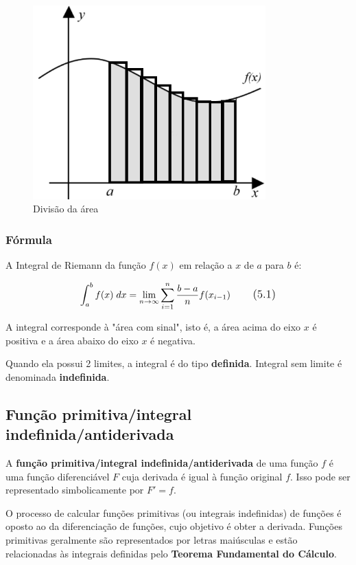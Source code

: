\begin{figure}[H]
	\centering
	\includegraphics[width=0.8\textwidth]{./Imagens/Integral de Riemann/RI2.png} 
	\caption{Divisão da área}
	\label{fig:RI2}
\end{figure}

\subsubsection{Fórmula}

A Integral de Riemann da função $f(x)$ em relação a $x$ de $a$ para $b$ é: 

\begin{equation}
\large \int_{a}^{b}f(x) \; dx = \lim_{n \rightarrow \infty}\sum_{i=1}^{n} \frac{b-a}{n}f(x_{i-1})
\tag{5.1}
\end{equation}

A integral corresponde à "área com sinal", isto é, a área acima do eixo $x$ é positiva e a área abaixo do eixo $x$ é negativa.

Quando ela possui 2 limites, a integral é do tipo \textbf{definida}. Integral sem limite é denominada \textbf{indefinida}.

\subsection{Função primitiva/integral indefinida/antiderivada}

A \textbf{função primitiva/integral indefinida/antiderivada} de uma função $f$ é uma função diferenciável $F$ cuja derivada é igual à função original $f$. Isso pode ser representado simbolicamente por $F' = f$.

O processo de calcular funções primitivas (ou integrais indefinidas) de funções é oposto ao da diferenciação de funções, cujo objetivo é obter a derivada. Funções primitivas geralmente são representados por letras maiúsculas e estão relacionadas às integrais definidas pelo \textbf{Teorema Fundamental do Cálculo}.

